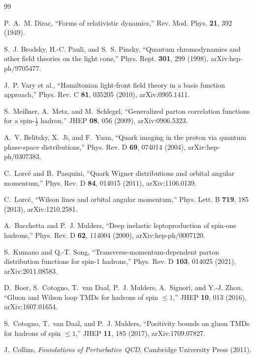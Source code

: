 \documentclass[11pt]{article}
\begin{document}
\small
\begin{thebibliography}{99}

P.~A.~M. Dirac,
``Forms of relativistic dynamics,''
Rev. Mod. Phys. \textbf{21}, 392 (1949).

S.~J. Brodsky, H.-C. Pauli, and S.~S. Pinsky,
``Quantum chromodynamics and other field theories on the light cone,''
Phys. Rept. \textbf{301}, 299 (1998),
arXiv:hep-ph/9705477.

J.~P. Vary et al.,
``Hamiltonian light-front field theory in a basis function approach,''
Phys. Rev. C \textbf{81}, 035205 (2010),
arXiv:0905.1411.

S.~Mei{\ss}ner, A.~Metz, and M.~Schlegel,
``Generalized parton correlation functions for a spin-\(\tfrac12\) hadron,''
JHEP \textbf{08}, 056 (2009),
arXiv:0906.5323.

A.~V. Belitsky, X.~Ji, and F.~Yuan,
``Quark imaging in the proton via quantum phase-space distributions,''
Phys. Rev. D \textbf{69}, 074014 (2004),
arXiv:hep-ph/0307383.

C.~Lorc\'e and B.~Pasquini,
``Quark Wigner distributions and orbital angular momentum,''
Phys. Rev. D \textbf{84}, 014015 (2011),
arXiv:1106.0139.

C.~Lorc\'e,
``Wilson lines and orbital angular momentum,''
Phys. Lett. B \textbf{719}, 185 (2013),
arXiv:1210.2581.

A.~Bacchetta and P.~J. Mulders,
``Deep inelastic leptoproduction of spin-one hadrons,''
Phys. Rev. D \textbf{62}, 114004 (2000),
arXiv:hep-ph/0007120.

S.~Kumano and Q.-T. Song,
``Transverse-momentum-dependent parton distribution functions for spin-1
hadrons,''
Phys. Rev. D \textbf{103}, 014025 (2021),
arXiv:2011.08583.

D.~Boer, S.~Cotogno, T.~van Daal, P.~J. Mulders, A.~Signori, and Y.-J. Zhou,
``Gluon and Wilson loop TMDs for hadrons of spin \(\leq1\),''
JHEP \textbf{10}, 013 (2016),
arXiv:1607.01654.

S.~Cotogno, T.~van Daal, and P.~J. Mulders,
``Positivity bounds on gluon TMDs for hadrons of spin \(\leq1\),''
JHEP \textbf{11}, 185 (2017),
arXiv:1709.07827.

J.~Collins,
\emph{Foundations of Perturbative QCD},
Cambridge University Press (2011).


\end{thebibliography}
\end{document}
